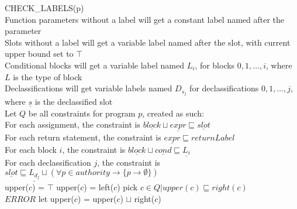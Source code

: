 \begin{algorithm}[h]
\SetAlgoNoEnd
CHECK\_LABELS(p)\\
Function parameters without a label will get a constant label named after the parameter\\
Slots without a label will get a variable label named after the slot, with current upper bound set to $\top$\\
Conditional blocks will get a variable label named $L_i$, for blocks $0, 1, \dots, i$, where $L$ is the type of block\\
Declassifications will get variable labels named $D_{s_j}$ for declassifications $0, 1, \dots, j$, where $\underline{s}$ is the declassified slot\\
Let $Q$ be all constraints for program $p$, created as such:\\
For each assignment, the constraint is $\underline{block} \sqcup \underline{expr} \sqsubseteq \underline{slot}$\\
For each return statement, the constraint is $\underline{expr} \sqsubseteq returnLabel$\\
For each block $i$, the constraint is $\underline{block} \sqcup \underline{cond} \sqsubseteq \underline{L_i}$\\
For each declassification $j$, the constraint is $\underline{slot} \sqsubseteq \underline{L_{d_j}} \sqcup (\forall p \in authority \longrightarrow \{ p \rightarrow \emptyset\})$\\
{
  {
    upper($c$) = $\top$
  }
  \Else
  {
    upper($c$) = left($c$)
  }
}
{
  pick $c \in Q | upper(c) \sqsubseteq right(c)$\\
  {
    $ERROR$
  }
  let upper($c$) = upper($c$) $\sqcup$ right($c$)
}
\end{algorithm}
